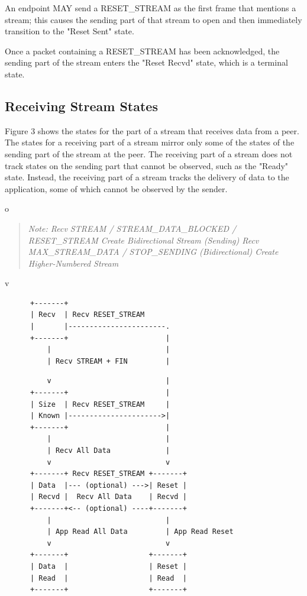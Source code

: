 \documentclass{article}
\begin{document}
An endpoint MAY send a RESET\_STREAM as the first frame that mentions a stream; this causes the sending part of that stream to open and then immediately transition to the "Reset Sent" state.

Once a packet containing a RESET\_STREAM has been acknowledged, the sending part of the stream enters the "Reset Recvd" state, which is a terminal state.

\subsection{Receiving Stream States}

Figure 3 shows the states for the part of a stream that receives data from a peer.  The states for a receiving part of a stream mirror only some of the states of the sending part of the stream at the peer. The receiving part of a stream does not track states on the sending part that cannot be observed, such as the "Ready" state.  Instead, the receiving part of a stream tracks the delivery of data to the application, some of which cannot be observed by the sender.

o

\begin{quote}
\textit{Note: Recv STREAM / STREAM\_DATA\_BLOCKED / RESET\_STREAM Create Bidirectional Stream (Sending) Recv MAX\_STREAM\_DATA / STOP\_SENDING (Bidirectional) Create Higher-Numbered Stream}
\end{quote}

v

\begin{verbatim}
      +-------+
      | Recv  | Recv RESET_STREAM
      |       |-----------------------.
      +-------+                       |
          |                           |
          | Recv STREAM + FIN         |
\end{verbatim}

\begin{verbatim}
          v                           |
      +-------+                       |
      | Size  | Recv RESET_STREAM     |
      | Known |---------------------->|
      +-------+                       |
          |                           |
          | Recv All Data             |
          v                           v
      +-------+ Recv RESET_STREAM +-------+
      | Data  |--- (optional) --->| Reset |
      | Recvd |  Recv All Data    | Recvd |
      +-------+<-- (optional) ----+-------+
          |                           |
          | App Read All Data         | App Read Reset
          v                           v
      +-------+                   +-------+
      | Data  |                   | Reset |
      | Read  |                   | Read  |
      +-------+                   +-------+

\end{verbatim}
\end{document}
